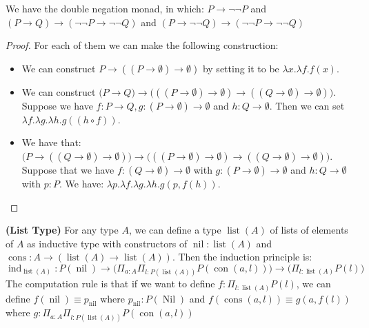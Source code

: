 {\color{violet} \begin{proposition}
    We have the double negation monad, in which: $P\to\neg\neg P$ and $(P\to Q)\to(\neg\neg P\to\neg\neg Q)$ and $(P\to\neg\neg Q)\to(\neg\neg P\to\neg\neg Q)$
\end{proposition}}
\begin{proof}

    For each of them we can make the following construction:
    \begin{itemize}
        \item We can construct $P\to((P\to\emptyset)\to\emptyset)$ by setting it to be $\lambda x.\lambda f.f(x)$. 
        \item We can construct $\big(P\to Q\big)\to\big( ((P\to\emptyset)\to\emptyset) \to ((Q\to\emptyset)\to\emptyset) \big)$. Suppose we have $f:P\to Q, g:(P\to\emptyset)\to\emptyset$ and $h:Q\to\emptyset$. Then we can set $\lambda f.\lambda g.\lambda h.g((h\circ f))$.
        \item We have that: $\big(P\to((Q\to\emptyset)\to\emptyset)\big)\to\big(((P\to\emptyset)\to\emptyset)\to((Q\to\emptyset)\to\emptyset)\big)$. Suppose that we have $f:(Q\to\emptyset)\to\emptyset$ with $g:(P\to\emptyset)\to\emptyset$ and $h:Q\to\emptyset$ with $p:P$. We have: $\lambda p.\lambda f.\lambda g.\lambda h. g(p, f(h))$.
    \end{itemize}
\end{proof}

\begin{definition}{\textbf{(List Type)}}
    For any type $A$, we can define a type $\operatorname{list}(A)$ of lists of elements of $A$ as inductive type with constructors of $\operatorname{nil}:\operatorname{list}(A)$ and $\operatorname{cons}:A\to(\operatorname{list}(A)\to\operatorname{list}(A))$. Then the induction principle is:
    \begin{equation*}
        \operatorname{ind}_{\operatorname{list}(A)}: P(\operatorname{nil})\to\Big(\Pi_{a:A}\Pi_{l:P(\operatorname{list}(A))}P(\operatorname{con}(a, l))\Big)\to\big(\Pi_{l:\operatorname{list}(A)}P(l)\big)
    \end{equation*}
    The computation rule is that if we want to define $f:\Pi_{l:\operatorname{list}(A)}P(l)$, we can define $f(\operatorname{nil})\equiv p_{\operatorname{nil}}$ where $p_{\operatorname{nil}}:P(\operatorname{Nil})$ and {\color{violet}$f(\operatorname{cons}(a, l))\equiv g(a, f(l))$ where $g:\Pi_{a:A}\Pi_{l:P(\operatorname{list}(A))}P(\operatorname{con}(a, l))$}
\end{definition}

